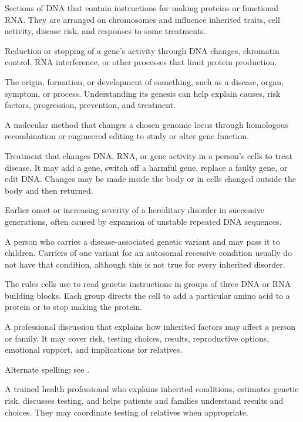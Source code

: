  Sections of DNA that contain instructions for making proteins or functional RNA. They are arranged on chromosomes and influence inherited traits, cell activity, disease risk, and responses to some treatments.

 Reduction or stopping of a gene's activity through DNA changes, chromatin control, RNA interference, or other processes that limit protein production.

 The origin, formation, or development of something, such as a disease, organ, symptom, or process. Understanding its genesis can help explain causes, risk factors, progression, prevention, and treatment.

 A molecular method that changes a chosen genomic locus through homologous recombination or engineered editing to study or alter gene function.

 Treatment that changes DNA, RNA, or gene activity in a person’s cells to treat disease. It may add a gene, switch off a harmful gene, replace a faulty gene, or edit DNA. Changes may be made inside the body or in cells changed outside the body and then returned.

 Earlier onset or increasing severity of a hereditary disorder in successive generations, often caused by expansion of unstable repeated DNA sequences.

 A person who carries a disease-associated genetic variant and may pass it to children. Carriers of one variant for an autosomal recessive condition usually do not have that condition, although this is not true for every inherited disorder.

 The rules cells use to read genetic instructions in groups of three DNA or RNA building blocks. Each group directs the cell to add a particular amino acid to a protein or to stop making the protein.

 A professional discussion that explains how inherited factors may affect a person or family. It may cover risk, testing choices, results, reproductive options, emotional support, and implications for relatives.

 Alternate spelling; see .

 A trained health professional who explains inherited conditions, estimates genetic risk, discusses testing, and helps patients and families understand results and choices. They may coordinate testing of relatives when appropriate.

